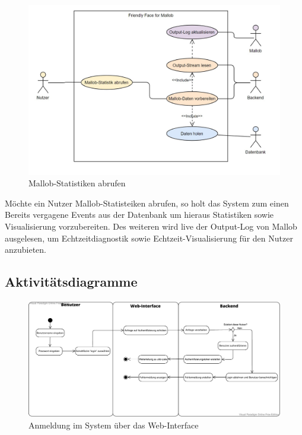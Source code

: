 

\begin{figure}[H]
    \centering
    \includegraphics[width=\textwidth]{images-interface/Mallob-visualisierung.jpg}
    \caption{Mallob-Statistiken abrufen}
\end{figure}
Möchte ein Nutzer Mallob-Statisteiken abrufen, so holt das System zum einen Bereits vergagene Events aus der Datenbank um hieraus Statistiken sowie Visualisierung vorzubereiten. Des weiteren wird live der Output-Log von Mallob ausgelesen, um Echtzeitdiagnostik sowie Echtzeit-Visualisierung für den Nutzer anzubieten. 


\pagebreak

\subsection{Aktivitätsdiagramme}
\begin{figure}[H]
    \centering
    \includegraphics[width=\textwidth]{images-interface/Anmelden_Aktivitaetsdiagramm.pdf}
    \caption{Anmeldung im System über das Web-Interface}
    \label{fig:login_activity}
    
\end{figure}


